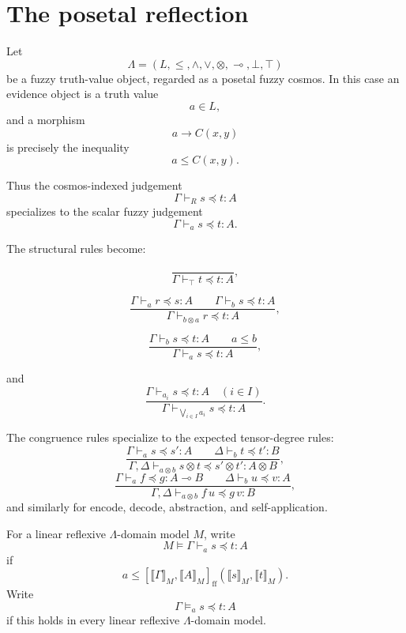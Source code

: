 \section{The posetal reflection}
\label{sec:posetal-reflection-affine-linear-type-theory}

Let
\[
    \Lambda=(L,\leq,\wedge,\vee,\otimes,\multimap,\bot,\top)
\]
be a fuzzy truth-value object, regarded as a posetal fuzzy cosmos.  In this
case an evidence object is a truth value
\[
    a\in L,
\]
and a morphism
\[
    a\to C(x,y)
\]
is precisely the inequality
\[
    a\leq C(x,y).
\]

Thus the cosmos-indexed judgement
\[
    \Gamma\vdash_R s\preceq t:A
\]
specializes to the scalar fuzzy judgement
\[
    \Gamma\vdash_a s\preceq t:A.
\]

The structural rules become:

\[
    \frac{}
         {\Gamma\vdash_{\top} t\preceq t:A},
\]

\[
    \frac{\Gamma\vdash_a r\preceq s:A
          \qquad
          \Gamma\vdash_b s\preceq t:A}
         {\Gamma\vdash_{b\otimes a} r\preceq t:A},
\]

\[
    \frac{\Gamma\vdash_b s\preceq t:A
          \qquad
          a\leq b}
         {\Gamma\vdash_a s\preceq t:A},
\]

and
\[
    \frac{\Gamma\vdash_{a_i} s\preceq t:A\quad(i\in I)}
         {\Gamma\vdash_{\bigvee_{i\in I}a_i} s\preceq t:A}.
\]

The congruence rules specialize to the expected tensor-degree rules:
\[
    \frac{\Gamma\vdash_a s\preceq s':A
          \qquad
          \Delta\vdash_b t\preceq t':B}
         {\Gamma,\Delta\vdash_{a\otimes b}
          s\otimes t\preceq s'\otimes t':A\otimes B},
\]
\[
    \frac{\Gamma\vdash_a f\preceq g:A\multimap B
          \qquad
          \Delta\vdash_b u\preceq v:A}
         {\Gamma,\Delta\vdash_{a\otimes b}
          f\,u\preceq g\,v:B},
\]
and similarly for encode, decode, abstraction, and self-application.

\begin{definition}
\label{def:posetal-semantic-validity-affine-linear}
For a linear reflexive \(\Lambda\)-domain model \(M\), write
\[
    M\models \Gamma\vdash_a s\preceq t:A
\]
if
\[
    a
    \leq
    [\llbracket \Gamma\rrbracket_M,
     \llbracket A\rrbracket_M]_{\mathrm{ff}}
    (\llbracket s\rrbracket_M,\llbracket t\rrbracket_M).
\]
Write
\[
    \Gamma\models_a s\preceq t:A
\]
if this holds in every linear reflexive \(\Lambda\)-domain model.
\end{definition}

